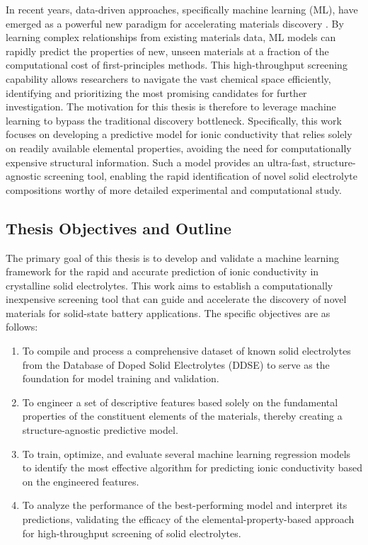 In recent years, data-driven approaches, specifically machine learning (ML), have emerged as a powerful new paradigm for accelerating materials discovery \cite{Butler2018}. By learning complex relationships from existing materials data, ML models can rapidly predict the properties of new, unseen materials at a fraction of the computational cost of first-principles methods. This high-throughput screening capability allows researchers to navigate the vast chemical space efficiently, identifying and prioritizing the most promising candidates for further investigation. The motivation for this thesis is therefore to leverage machine learning to bypass the traditional discovery bottleneck. Specifically, this work focuses on developing a predictive model for ionic conductivity that relies solely on readily available elemental properties, avoiding the need for computationally expensive structural information. Such a model provides an ultra-fast, structure-agnostic screening tool, enabling the rapid identification of novel solid electrolyte compositions worthy of more detailed experimental and computational study.

\subsection{Thesis Objectives and Outline}

The primary goal of this thesis is to develop and validate a machine learning framework for the rapid and accurate prediction of ionic conductivity in crystalline solid electrolytes. This work aims to establish a computationally inexpensive screening tool that can guide and accelerate the discovery of novel materials for solid-state battery applications. The specific objectives are as follows:

\begin{enumerate}
    \item To compile and process a comprehensive dataset of known solid electrolytes from the Database of Doped Solid Electrolytes (DDSE) \cite{DDSE2021} to serve as the foundation for model training and validation.
    \item To engineer a set of descriptive features based solely on the fundamental properties of the constituent elements of the materials, thereby creating a structure-agnostic predictive model.
    \item To train, optimize, and evaluate several machine learning regression models to identify the most effective algorithm for predicting ionic conductivity based on the engineered features.
    \item To analyze the performance of the best-performing model and interpret its predictions, validating the efficacy of the elemental-property-based approach for high-throughput screening of solid electrolytes.
\end{enumerate}

